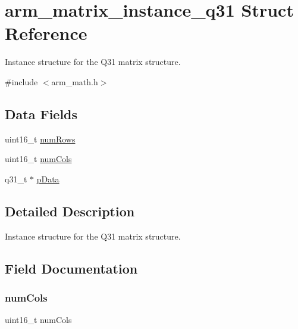 \hypertarget{structarm__matrix__instance__q31}{}\section{arm\+\_\+matrix\+\_\+instance\+\_\+q31 Struct Reference}
\label{structarm__matrix__instance__q31}


Instance structure for the Q31 matrix structure.  




{\ttfamily \#include $<$arm\+\_\+math.\+h$>$}

\subsection*{Data Fields}
\begin{DoxyCompactItemize}
\item 
uint16\+\_\+t \hyperlink{structarm__matrix__instance__q31_a1bcf80ccdc2acc29198f1592ae300390}{num\+Rows}
\item 
uint16\+\_\+t \hyperlink{structarm__matrix__instance__q31_a4bb5ec0d13eb4c9cf887aa8366a44117}{num\+Cols}
\item 
q31\+\_\+t $\ast$ \hyperlink{structarm__matrix__instance__q31_ad296f76577326ff280726323536eed6d}{p\+Data}
\end{DoxyCompactItemize}


\subsection{Detailed Description}
Instance structure for the Q31 matrix structure. 

\subsection{Field Documentation}
\mbox{\label{structarm__matrix__instance__q31_a4bb5ec0d13eb4c9cf887aa8366a44117}} 
\subsubsection{\texorpdfstring{num\+Cols}{numCols}}
{\footnotesize\ttfamily uint16\+\_\+t num\+Cols}

